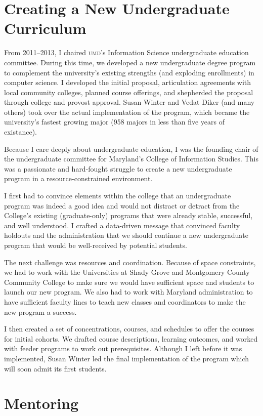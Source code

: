\documentclass[11pt]{amsart}
\newcommand{\abr}[1]{\textsc{#1}}
\begin{document}
\section{Creating a New Undergraduate Curriculum}

From 2011--2013, I chaired \abr{umd}'s Information Science undergraduate
education committee. During this time, we developed a new undergraduate degree
program to complement the university's existing strengths (and exploding
enrollments) in computer science. I developed the initial proposal,
articulation agreements with local community colleges, planned course
offerings, and shepherded the proposal through college and provost approval.
Susan Winter and Vedat Diker (and many others) took over the actual
implementation of the program, which became the university's fastest growing
major (958 majors in less than five years of existance).


Because I care deeply about undergraduate education, I was the founding chair of
the undergraduate committee for Maryland's College of Information Studies.  This was a
passionate and hard-fought struggle to create a new undergraduate program in a
resource-constrained environment.

I first had to convince elements within the college that an undergraduate
program was indeed a good idea and would not distract or detract from the
College's existing (graduate-only) programs that were already stable,
successful, and well understood.  I crafted a data-driven message that convinced
faculty holdouts and the administration that we should continue a new
undergraduate program that would be well-received by potential students.

The next challenge was resources and coordination.  Because of space constraints,
we had to work with the Universities at Shady Grove and Montgomery County
Community College to make sure we would have sufficient space and students to
launch our new program.  We also had to work with Maryland administration to
have sufficient faculty lines to teach new classes and coordinators to make the
new program a success.

I then created a set of concentrations, courses, and schedules to offer the
courses for initial cohorts.  We drafted course descriptions, learning outcomes,
and worked with feeder programs to work out prerequisites.  Although I left
before it was implemented, Susan Winter led the final implementation of the
program which will soon admit its first students.

\section{Mentoring}
\end{document}
